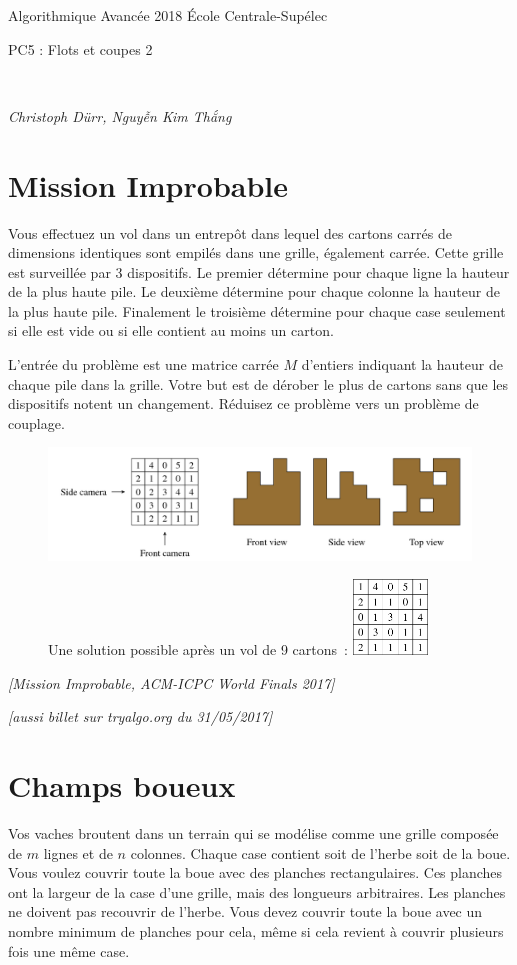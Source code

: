 \documentclass[12pt]{article}
\newcommand{\source}[1]{\begin{flushright}\emph{[#1]}\end{flushright}}
\newcommand{\MakeScribeTop}[1]{
\noindent
\begin{framed}
\noindent
 Algorithmique Avancée 2018
 \hfill
 École Centrale-Supélec
 \\[1em]
 \centerline{ \Large
#1
 }
 \\[1em]
\centerline{  \it Christoph Dürr, Nguyễn Kim Thắng}
\end{framed}
}
\begin{document}
    \MakeScribeTop{PC5 : Flots et coupes 2}

\section{Mission Improbable}

Vous effectuez un vol dans un entrepôt dans lequel des cartons carrés de dimensions identiques sont empilés dans une grille, également carrée.  
Cette grille est surveillée par 3 dispositifs. Le premier détermine pour chaque ligne la hauteur de la plus haute pile.
Le deuxième détermine pour chaque colonne la hauteur de la plus haute pile.
Finalement le troisième détermine pour chaque case seulement si elle est vide ou si elle contient au moins un carton.

L'entrée du problème est une matrice carrée $M$ d'entiers indiquant la hauteur de chaque pile dans la grille.
Votre but est de dérober le plus de cartons sans que les dispositifs notent un changement.  Réduisez ce problème vers un problème de couplage.

\begin{figure}[h]
	\centerline{\includegraphics{mission_impossible_in.png}}
	\centerline{Une solution possible après un vol de 9 cartons~: \includegraphics[width=2cm]{mission_impossible_out.png}}
\end{figure}

\source{Mission Improbable, ACM-ICPC World Finals 2017}
\source{aussi billet sur tryalgo.org du 31/05/2017}

\newpage 
\section{Champs boueux}

Vos vaches broutent dans un terrain qui se modélise comme une grille composée de $m$ lignes et de $n$ colonnes. Chaque case contient soit de l'herbe soit de la boue. Vous voulez couvrir toute la boue avec des planches rectangulaires. Ces planches ont la largeur de la case d'une grille, mais des longueurs arbitraires. Les planches ne doivent pas recouvrir de l'herbe.  Vous devez couvrir toute la boue avec un nombre minimum de planches pour cela, même si cela revient à couvrir plusieurs fois une même case. 
\end{document}
